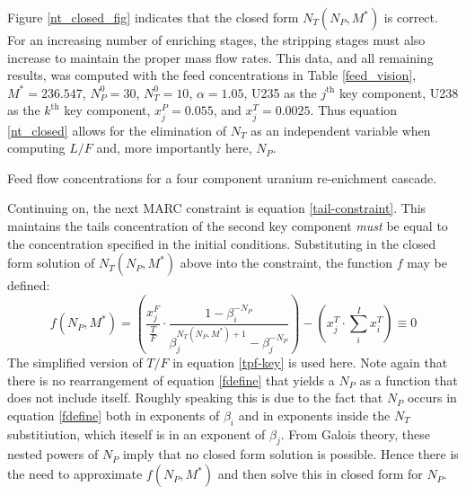 \documentclass{ansconf}
\newcommand{\nuc}[2]{{#1}{#2}}
\newcommand{\jth}[0]{$j^{\mbox{th}}$ }
\newcommand{\kth}[0]{$k^{\mbox{th}}$ }
\begin{document}
Figure \ref{nt_closed_fig} indicates that the closed form $N_T(N_P, M^*)$ is correct.
For an increasing number of enriching stages, the stripping stages must also 
increase to maintain the proper mass flow rates.
This data, and all remaining results, was computed 
with the feed concentrations in Table \ref{feed_vision}, 
$M^*=236.547$, $N_P^0=30$, $N_T^0=10$, $\alpha=1.05$, 
\nuc{U}{235} as the \jth key component, \nuc{U}{238} as the \kth key component, 
$x_j^P=0.055$, and $x_j^T=0.0025$.
Thus equation \ref{nt_closed} allows for the elimination of $N_T$ as an 
independent variable when computing $L/F$ and, more importantly here, $N_P$.  

\begin{table}[htbp]
\begin{center}
\caption{Feed flow concentrations for a four component uranium re-enichment cascade.}

\label{feed_vision}
\end{center}
\end{table}

Continuing on, the next MARC constraint is equation \ref{tail-constraint}.  
This maintains
the tails concentration of the second key component \emph{must} be equal to the 
concentration specified in the initial conditions.  
Substituting in the closed form solution of $N_T(N_P, M^*)$ above into the constraint, 
the function $f$ may be defined:
\begin{equation}
f(N_P,M^*) =
\left(\frac{x_j^F}{\frac{T}{F}} \cdot \frac{1 - \beta_i^{-N_P}}
                                           {\beta_j^{N_T(N_P,M^*)+1} - \beta_j^{-N_P}} \right)
- \left(x_j^T\cdot\sum_i^{I} x_i^T\right) \equiv 0
\label{fdefine}
\end{equation}
The simplified version of $T/F$ in equation \ref{tpf-key} is used here.  Note again
that there is no rearrangement of equation \ref{fdefine} that yields a $N_P$ as 
a function that does not include itself.  Roughly speaking this is due to the 
fact that $N_P$ occurs in equation \ref{fdefine} both in exponents of $\beta_i$ and
in exponents inside the $N_T$ substitiution, which iteself is in an exponent of 
$\beta_j$.  From Galois theory, these nested powers of $N_P$ imply that no closed form 
solution is possible.   Hence there is the need to approximate $f(N_P, M^*)$ and then
solve this in closed form for $N_P$.
\end{document}
